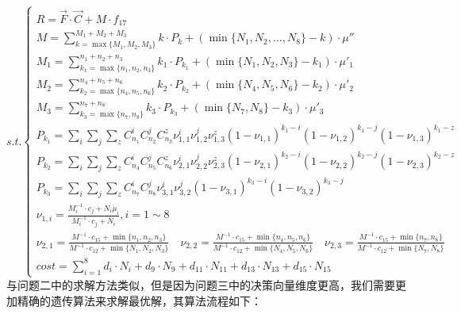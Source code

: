 \documentclass[withoutpreface,bwprint]{cumcmthesis} %
\begin{document}
\begin{equation*}
	s.t.\begin{cases}
		R=\vec{F}\cdot \vec{C} + M\cdot f_{17}                                                                                                 \\
		M=\sum_{k=\max \{M_{1},M_{2},M_{3}\}}^{M_{1}+M_{2}+M_{3}}k\cdot P_{k}+(\min \{N_{1},N_{2},\dots,N_{8}\}-k)\cdot \mu''                  \\
		M_{1}=\sum_{k_{1}=\max \{n_{1},n_{2},n_{3}\}}^{n_{1}+n_{2}+n_{3}}k_{1}\cdot P_{k_{1}}+(\min \{N_{1},N_{2},N_{3}\}-k_{1})\cdot \mu'_{1} \\
		M_{2}=\sum_{k_{2}=\max \{n_{4},n_{5},n_{6}\}}^{n_{4}+n_{5}+n_{6}}k_{2}\cdot P_{k_{2}}+(\min \{N_{4},N_{5},N_{6}\}-k_{2})\cdot \mu'_{2} \\
		M_{3}=\sum_{k_{3}=\max \{n_{7},n_{8}\}}^{n_{7}+n_{8}}k_{3}\cdot P_{k_{3}}+(\min \{N_{7},N_{8}\}-k_{3})\cdot \mu'_{3}                   \\
		P_{k_{1}}=\sum_{i}\sum_{j}\sum_{z}C_{n_{1}}^{i}C_{n_{2}}^{j}C_{n_{3}}^{z}\nu_{1,1}^{i}\nu_{1,2}^{j}\nu_{1,3}^{z}(1-\nu_{1,1})^{k_{1}-i}(1-\nu_{1,2})^{k_{1}-j}(1-\nu_{
		1,3})^{k_{1}-z}                                                                                                                        \\
		P_{k_{2}}=\sum_{i}\sum_{j}\sum_{z}C_{n_{4}}^{i}C_{n_{5}}^{j}C_{n_{6}}^{z}\nu_{2,1}^{i}\nu_{2,2}^{j}\nu_{2,3}^{z}(1-\nu_{2,1})^{k_{2}-i}(1-\nu_{2,2})^{k_{2}-j}(1-\nu_{
		2,3})^{k_{2}-z}                                                                                                                        \\
		P_{k_{3}}=\sum_{i}\sum_{j}\sum_{z}C_{n_{7}}^{i}C_{n_{8}}^{j}\nu_{3,1}^{i}\nu_{3,2}^{j}(1-\nu_{3,1})^{k_{3}-i}(1-\nu_{3,2})^{k_{3}-j}   \\
		\nu_{1,i}=\frac{M_{i}^{-1}\cdot c_{j}+N_{i}\mu_{i}}{M_{i}^{-1}\cdot c_{j}+N_{i}} ,i=1\sim8                                                                   \\
\nu_{2,1}=\frac{M^{-1}\cdot c_{15}+\min \{ n_{1},n_{2},n_{3}\}}{M^{-1}\cdot c_{12}+\min \{N_{1},N_{2},N_{3}\}}\quad
\nu_{2,2}=\frac{M^{-1}\cdot c_{15}+\min \{ n_{4},n_{5},n_{6}\}}{M^{-1}\cdot c_{12}+\min \{N_{4},N_{5},N_{6}\}}\quad
\nu_{2,3}=\frac{M^{-1}\cdot c_{15}+\min \{ n_{7},n_{8}\}}{M^{-1}\cdot c_{12}+\min \{N_{7},N_{8}\}}                       \\
		cost = \sum_{i=1}^{8}d_{i}\cdot N_{i}+d_{9}\cdot N_{9}+d_{11}\cdot N_{11}+d_{13}\cdot N_{13}+d_{15}\cdot N_{15}
	\end{cases}
\end{equation*}
与问题二中的求解方法类似，但是因为问题三中的决策向量维度更高，我们需要更加精确的遗传算法来求解最优解，其算法流程如下：
\end{document}
